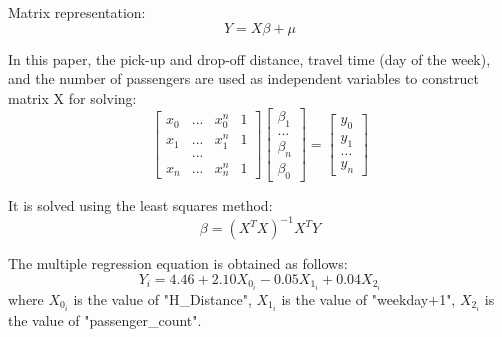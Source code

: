 \documentclass{tikzposter} %
\begin{document}
\begin{columns}
{\begin{description}
    Matrix representation:$$
    {Y} ={X}{\beta}+{\mu}$$
    \item[Solution]
    In this paper, the pick-up and drop-off distance, travel time (day of the week), and the number of passengers are used as independent variables to construct matrix X for solving: 
    \begin{equation*}
      \left[
      \begin{array}{cccc}
      x_{0} &...  & x_{0}^{n} & 1\\
      x_{1} &...  & x_{1}^{n} & 1\\
        &...&  &\\
      x_{n} &...  &x_{n}^{n} & 1
      \end{array}
      \right ]
      \left[
      \begin{array}{cccc}
      {\beta}_{1}\\
      \ldots \\
      {\beta}_{n}\\
      {\beta}_{0}
      \end{array}
      \right ]
      =
      \left[
      \begin{array}{cccc}
      y_{0}\\
      y_{1}\\
      \ldots \\
      y_{n}
      \end{array}
      \right ]
    \end{equation*}
    
    It is solved using the least squares method:$$
    {\beta}=({X^T}{X})^{-1}{X^T}Y
    $$

    The multiple regression equation is obtained as follows:$$
    {Y_i} =4.46+2.10{X_{0_i}}-0.05{X_{1_i}}+0.04{X_{2_i}}
    $$where ${X_{0_i}}$ is the value of "H\_Distance", ${X_{1_i}}$ is the value of "weekday+1", ${X_{2_i}}$ is the value of "passenger\_count".


\end{description}
\vspace{.5cm}


}
\end{columns}
\end{document}

